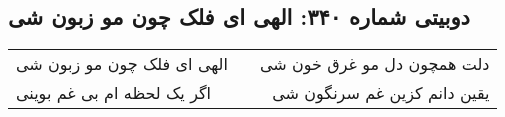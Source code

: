 \begin{center}
\section*{دوبیتی شماره ۳۴۰: الهی ای فلک چون مو زبون شی}
\label{sec:340}
\begin{longtable}{l p{0.5cm} r}
الهی ای فلک چون مو زبون شی
&&
دلت همچون دل مو غرق خون شی
\\
اگر یک لحظه ام بی غم بوینی
&&
یقین دانم کزین غم سرنگون شی
\\
\end{longtable}
\end{center}

